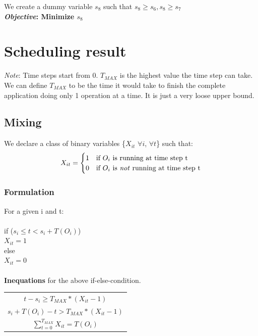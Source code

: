 \documentclass{article}
\begin{document}
\noindent
 We create a dummy variable $s_8$ such that $s_8 \geq s_6, s_8 \geq s_7$\\
\textbf{\emph{Objective}: Minimize $s_8$}

\section{Scheduling result}
\emph{Note}: Time steps start from 0. \emph{$T_{MAX}$} is the highest value the time step 
can take. We can define \emph{$T_{MAX}$} to be the time it would take to finish the complete
application doing only 1 operation at a time. It is just a very loose upper bound.\\  
\subsection{Mixing}
We declare a class of binary variables \{$X_{it}$ $\forall i$, $\forall t$\} such that: \\

\begin{equation*}
  X_{it} = \begin{cases}
  1  &  \text{if }O_i \text{ is running at time step t} \\
  0  &  \text{if }O_i \text{ is \emph{not} running at time step t}
  \end{cases}
\end{equation*}

\subsubsection{Formulation}
For a given i and t:\\\\
if ($s _i \leq t < s_i + T(O_i)$) \\
\indent $X_{it} = 1$\\
else\\
\indent $X_{it} = 0$\\
\\\noindent \textbf{Inequations} for the above if-else-condition.

\begin{center}
\begin{tabular}{|c|}
\hline
$t-s_i \geq T_{MAX}*(X_{it}-1)$\\
$s_i + T(O_i) - t > T_{MAX}*(X_{it}-1)$\\
$\sum\limits_{t=0}^{T_{MAX}}X_{it}=T(O_i)$\\
\hline
\end{tabular}
\end{center}
\end{document}
